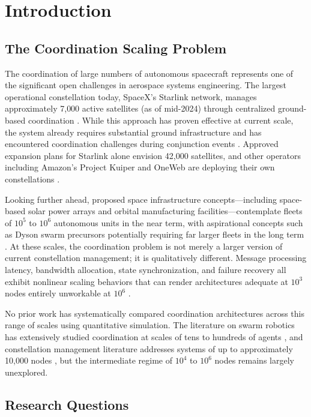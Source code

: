\documentclass[journal]{IEEEtran}
\begin{document}
\section{Introduction}

\subsection{The Coordination Scaling Problem}

The coordination of large numbers of autonomous spacecraft represents one of the significant open challenges in aerospace systems engineering. The largest operational constellation today, SpaceX's Starlink network, manages approximately 7{,}000 active satellites (as of mid-2024) through centralized ground-based coordination \cite{starlink_ops}. While this approach has proven effective at current scale, the system already requires substantial ground infrastructure and has encountered coordination challenges during conjunction events \cite{esa_conjunction}. Approved expansion plans for Starlink alone envision 42{,}000 satellites, and other operators including Amazon's Project Kuiper and OneWeb are deploying their own constellations \cite{kuiper, oneweb_mgmt}.

Looking further ahead, proposed space infrastructure concepts---including space-based solar power arrays and orbital manufacturing facilities---contemplate fleets of $10^5$ to $10^6$ autonomous units in the near term, with aspirational concepts such as Dyson swarm precursors potentially requiring far larger fleets in the long term \cite{oneil_1976, badescu_2006}. At these scales, the coordination problem is not merely a larger version of current constellation management; it is qualitatively different. Message processing latency, bandwidth allocation, state synchronization, and failure recovery all exhibit nonlinear scaling behaviors that can render architectures adequate at $10^3$ nodes entirely unworkable at $10^6$ \cite{lynch_distributed}.

No prior work has systematically compared coordination architectures across this range of scales using quantitative simulation. The literature on swarm robotics has extensively studied coordination at scales of tens to hundreds of agents \cite{brambilla_2013}, and constellation management literature addresses systems of up to approximately 10{,}000 nodes \cite{wertz_smad}, but the intermediate regime of $10^4$ to $10^6$ nodes remains largely unexplored.

\subsection{Research Questions}
\end{document}
